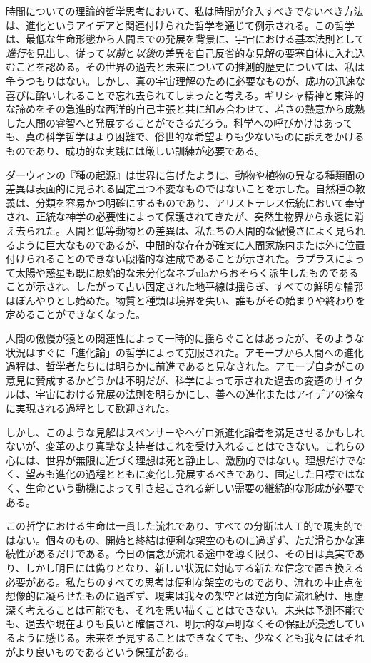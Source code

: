 \documentclass[a4paper,11pt,openany]{ltjsbook}
\begin{document}
時間についての理論的哲学思考において、私は時間が介入すべきでないべき方法は、進化というアイデアと関連付けられた哲学を通じて例示される。この哲学は、最低な生命形態から人間までの発展を背景に、宇宙における基本法則として\textit{進行}を見出し、従って\textit{以前}と\textit{以後}の差異を自己反省的な見解の要塞自体に入れ込むことを認める。その世界の過去と未来についての推測的歴史については、私は争うつもりはない。しかし、真の宇宙理解のために必要なものが、成功の迅速な喜びに酔いしれることで忘れ去られてしまったと考える。ギリシャ精神と東洋的な諦めをその急進的な西洋的自己主張と共に組み合わせて、若さの熱意から成熟した人間の睿智へと発展することができるだろう。科学への呼びかけはあっても、真の科学哲学はより困難で、俗世的な希望よりも少ないものに訴えをかけるものであり、成功的な実践には厳しい訓練が必要である。

ダーウィンの『種の起源』は世界に告げたように、動物や植物の異なる種類間の差異は表面的に見られる固定且つ不変なものではないことを示した。自然種の教義は、分類を容易かつ明確にするものであり、アリストテレス伝統において奉守され、正統な神学の必要性によって保護されてきたが、突然生物界から永遠に消え去られた。人間と低等動物との差異は、私たちの人間的な傲慢さによく見られるように巨大なものであるが、中間的な存在が確実に人間家族内または外に位置付けられることのできない段階的な達成であることが示された。ラプラスによって太陽や惑星も既に原始的な未分化なネブulaからおそらく派生したものであることが示され、したがって古い固定された地平線は揺らぎ、すべての鮮明な輪郭はぼんやりとし始めた。物質と種類は境界を失い、誰もがその始まりや終わりを定めることができなくなった。

人間の傲慢が猿との関連性によって一時的に揺らぐことはあったが、そのような状況はすぐに「進化論」の哲学によって克服された。アモーブから人間への進化過程は、哲学者たちには明らかに前進であると見なされた。アモーブ自身がこの意見に賛成するかどうかは不明だが、科学によって示された過去の変遷のサイクルは、宇宙における発展の法則を明らかにし、善への進化またはアイデアの徐々に実現される過程として歓迎された。

しかし、このような見解はスペンサーやヘゲロ派進化論者を満足させるかもしれないが、変革のより真摯な支持者はこれを受け入れることはできない。これらの心には、世界が無限に近づく理想は死と静止し、激励的ではない。理想だけでなく、望みも進化の過程とともに変化し発展するべきであり、固定した目標ではなく、生命という動機によって引き起こされる新しい需要の継続的な形成が必要である。

この哲学における生命は一貫した流れであり、すべての分断は人工的で現実的ではない。個々のもの、開始と終結は便利な架空のものに過ぎず、ただ滑らかな連続性があるだけである。今日の信念が流れる途中を導く限り、その日は真実であり、しかし明日には偽りとなり、新しい状況に対応する新たな信念で置き換える必要がある。私たちのすべての思考は便利な架空のものであり、流れの中止点を想像的に凝らせたものに過ぎず、現実は我々の架空とは逆方向に流れ続け、思慮深く考えることは可能でも、それを思い描くことはできない。未来は予測不能でも、過去や現在よりも良いと確信され、明示的な声明なくその保証が浸透しているように感じる。未来を予見することはできなくても、少なくとも我々にはそれがより良いものであるという保証がある。
\end{document}
